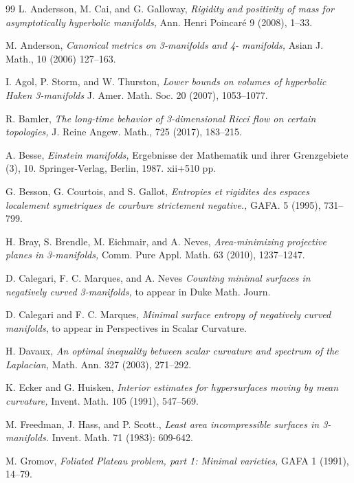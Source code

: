\documentclass[11pt]{amsart}
\theoremstyle{remark}
\theoremstyle{definition}
\begin{document}
{{\begin{thebibliography}{99}
		 L. Andersson, M. Cai, and G. Galloway,
		{\em Rigidity and positivity of mass for asymptotically hyperbolic manifolds,} 
		Ann. Henri Poincar\'e 9 (2008),  1--33.
		
		 M. Anderson, {\em Canonical metrics on 3-manifolds and 4-
			manifolds,} Asian J. Math., 10  (2006) 127--163.
		
		 I. Agol, P. Storm, and W. Thurston, {\em Lower bounds on volumes of hyperbolic Haken 3-manifolds} J. Amer. Math. Soc. 20 (2007), 1053--1077.
		
		
		 R. Bamler,  {\em The long-time behavior of 3-dimensional Ricci flow on certain topologies,} J. Reine Angew. Math., 725 (2017), 183--215.
		
		 A. Besse, {\em Einstein manifolds,} Ergebnisse der Mathematik und ihrer Grenzgebiete (3), 10. Springer-Verlag, Berlin, 1987. xii+510 pp. 
		
		 G. Besson, G. Courtois, and S. Gallot, {\em  Entropies et rigidites des espaces localement symetriques de courbure strictement negative.,} GAFA. 5 (1995), 731--799.
		
		 H. Bray, S. Brendle, M. Eichmair, and A. Neves, {\em Area-minimizing projective planes in 3-manifolds,}
		Comm. Pure Appl. Math. 63 (2010), 1237--1247.
		
		 D. Calegari, F. C. Marques, and A. Neves {\em Counting minimal surfaces in negatively curved 3-manifolds,} to appear in Duke Math. Journ.
		
		 D. Calegari and F. C. Marques, {\em Minimal surface entropy of negatively curved manifolds}, to appear in  Perspectives in Scalar Curvature. 
		
		
		 H. Davaux, {\em An optimal inequality between scalar curvature and spectrum of the Laplacian,}
		Math. Ann. 327 (2003), 271--292.
		
		 K. Ecker and G. Huisken, {\em Interior estimates for hypersurfaces moving by mean curvature,} Invent. Math. 105 (1991), 547--569.
		
		 M. Freedman, J. Hass, and P. Scott., {\em Least area incompressible surfaces in 3-manifolds.} Invent. Math. 71 (1983): 609-642.
		
		

		 M. Gromov, {\em Foliated Plateau problem, part 1: Minimal varieties,} GAFA
		1 (1991), 14--79.
		

\end{thebibliography}}}
\end{document}

